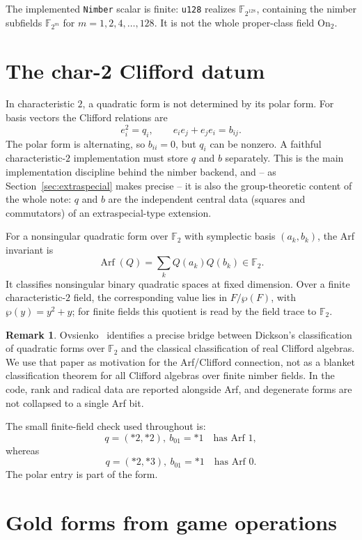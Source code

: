 \documentclass[11pt]{article}
\theoremstyle{plain}
\theoremstyle{definition}
\newtheorem{remark}{Remark}
\newcommand{\On}{\mathrm{On}_2}
\newcommand{\F}{\mathbb{F}}
\newcommand{\Arf}{\operatorname{Arf}}
\begin{document}
The implemented \texttt{Nimber} scalar is finite: \texttt{u128} realizes
$\F_{2^{128}}$, containing the nimber subfields $\F_{2^m}$ for
$m=1,2,4,\ldots,128$. It is not the whole proper-class field $\On$.

\section{The char-2 Clifford datum}\label{sec:datum}

In characteristic $2$, a quadratic form is not determined by its polar form.
For basis vectors the Clifford relations are
\[
  e_i^2=q_i,\qquad e_i e_j+e_j e_i=b_{ij}.
\]
The polar form is alternating, so $b_{ii}=0$, but $q_i$ can be nonzero. A
faithful characteristic-$2$ implementation must store $q$ and $b$ separately.
This is the main implementation discipline behind the nimber backend, and --
as Section~\ref{sec:extraspecial} makes precise -- it is also the
group-theoretic content of the whole note: $q$ and $b$ are the independent
central data (squares and commutators) of an extraspecial-type extension.

For a nonsingular quadratic form over $\F_2$ with symplectic basis
$(a_k,b_k)$, the Arf invariant is
\[
  \Arf(Q)=\sum_k Q(a_k)Q(b_k)\in \F_2.
\]
It classifies nonsingular binary quadratic spaces at fixed dimension. Over a
finite characteristic-$2$ field, the corresponding value lies in
$F/\wp(F)$, with $\wp(y)=y^2+y$; for finite fields this quotient is read by the
field trace to $\F_2$.

\begin{remark}
Ovsienko~\cite{Ovsienko16} identifies a precise bridge between Dickson's
classification of quadratic forms over $\F_2$ and the classical classification
of real Clifford algebras. We use that paper as motivation for the Arf/Clifford
connection, not as a blanket classification theorem for all Clifford algebras
over finite nimber fields. In the code, rank and radical data are reported
alongside Arf, and degenerate forms are not collapsed to a single Arf bit.
\end{remark}

The small finite-field check used throughout is:
\[
  q=(\ast2,\ast2),\ b_{01}=\ast1 \quad\text{has Arf }1,
\]
whereas
\[
  q=(\ast2,\ast3),\ b_{01}=\ast1 \quad\text{has Arf }0.
\]
The polar entry is part of the form.

\section{Gold forms from game operations}\label{sec:gold}
\end{document}
